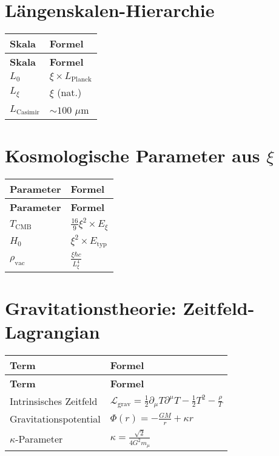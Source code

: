 \documentclass[12pt,a4paper]{article}
\begin{document}
	\section{Längenskalen-Hierarchie}
	
	\begin{longtable}{|p{3cm}|p{4cm}|}
		\hline
		\textbf{Skala} & \textbf{Formel} \\
		\hline
		\endfirsthead
		\hline
		\textbf{Skala} & \textbf{Formel} \\
		\hline
		\endhead
		\(L_0\) & \(\xi \times L_{\text{Planck}}\) \\
		\hline
		\(L_{\xi}\) & \(\xi\) (nat.) \\
		\hline
		\(L_{\text{Casimir}}\) & \(\sim 100\) \(\mu\)m \\
		\hline
	\end{longtable}
	
	\section{Kosmologische Parameter aus \(\xi\)}
	
	\begin{longtable}{|p{3cm}|p{4cm}|}
		\hline
		\textbf{Parameter} & \textbf{Formel} \\
		\hline
		\endfirsthead
		\hline
		\textbf{Parameter} & \textbf{Formel} \\
		\hline
		\endhead
		\(T_{\text{CMB}}\) & \(\frac{16}{9}\xi^{2} \times E_{\xi}\) \\
		\hline
		\(H_0\) & \(\xi^{2} \times E_{\text{typ}}\) \\
		\hline
		\(\rho_{\text{vac}}\) & \(\frac{\xi\hbar c}{L_{\xi}^{4}}\) \\
		\hline
	\end{longtable}
	
	\section{Gravitationstheorie: Zeitfeld-Lagrangian}
	
	\begin{longtable}{|p{4cm}|p{5cm}|}
		\hline
		\textbf{Term} & \textbf{Formel} \\
		\hline
		\endfirsthead
		\hline
		\textbf{Term} & \textbf{Formel} \\
		\hline
		\endhead
		Intrinsisches Zeitfeld & \(\mathcal{L}_{\text{grav}} = \frac{1}{2}\partial_{\mu}T\partial^{\mu}T - \frac{1}{2}T^{2} - \frac{\rho}{T}\) \\
		\hline
		Gravitationspotential & \(\Phi(r) = -\frac{GM}{r} + \kappa r\) \\
		\hline
		\(\kappa\)-Parameter & \(\kappa = \frac{\sqrt{2}}{4G^{2}m_{\mu}}\) \\
		\hline
	\end{longtable}
	
\end{document}
